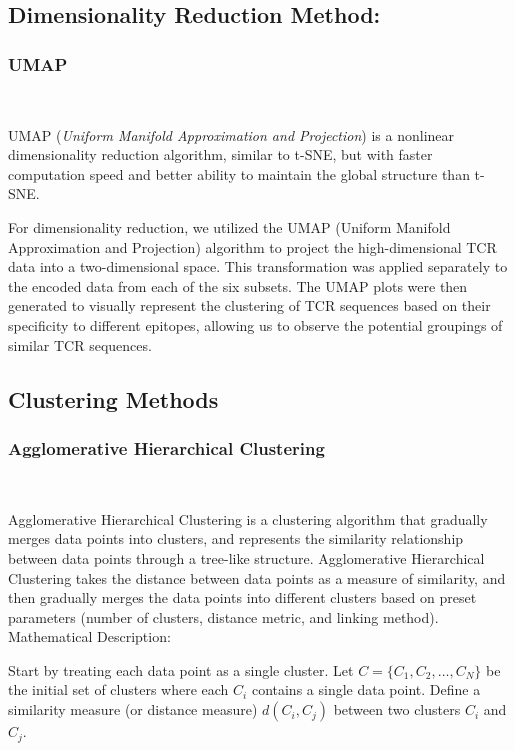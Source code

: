 \documentclass[conference]{IEEEtran}
\begin{document}
    \subsection{Dimensionality Reduction Method:}
	\subsubsection{UMAP} \
	
	UMAP (\emph{Uniform Manifold Approximation and Projection}) is a nonlinear dimensionality reduction algorithm, similar to t-SNE, but with faster computation speed and better ability to maintain the global structure than t-SNE.
	
	For dimensionality reduction, we utilized the UMAP (Uniform Manifold Approximation and Projection) algorithm to project the high-dimensional TCR data into a two-dimensional space. This transformation was applied separately to the encoded data from each of the six subsets. The UMAP plots were then generated to visually represent the clustering of TCR sequences based on their specificity to different epitopes, allowing us to observe the potential groupings of similar TCR sequences.
      
    \subsection{Clustering Methods}
	\subsubsection{Agglomerative Hierarchical Clustering} \
	
	Agglomerative Hierarchical Clustering\cite{b4} is a clustering algorithm that gradually merges data points into clusters, and represents the similarity relationship between data points through a tree-like structure. Agglomerative Hierarchical Clustering takes the distance between data points as a measure of similarity, and then gradually merges the data points into different clusters based on preset parameters (number of clusters, distance metric, and linking method).
    \\
	
	Mathematical Description:
	
	Start by treating each data point as a single cluster. Let $C = \{C_1, C_2, \ldots, C_N\}$ be the initial set of clusters where each $C_i$ contains a single data point. Define a similarity measure (or distance measure) $d(C_i, C_j)$ between two clusters $C_i$ and $C_j$.
	
\end{document}
